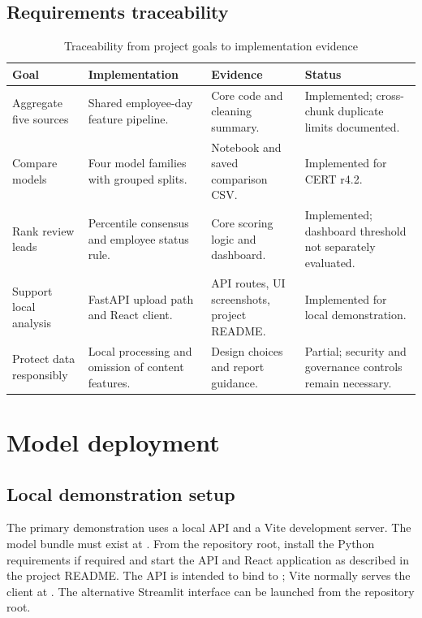 \section{Requirements traceability}
\begin{table}[H]
\centering
\tablefont
\caption{Traceability from project goals to implementation evidence}
\label{tab:traceability}
\begin{tabularx}{\textwidth}{|p{}|p{}|p{}|Y|}
\hline
\textbf{Goal} & \textbf{Implementation} & \textbf{Evidence} & \textbf{Status}\\\hline
Aggregate five sources & Shared employee-day feature pipeline. & Core code and cleaning summary. & Implemented; cross-chunk duplicate limits documented.\\\hline
Compare models & Four model families with grouped splits. & Notebook and saved comparison CSV. & Implemented for CERT r4.2.\\\hline
Rank review leads & Percentile consensus and employee status rule. & Core scoring logic and dashboard. & Implemented; dashboard threshold not separately evaluated.\\\hline
Support local analysis & FastAPI upload path and React client. & API routes, UI screenshots, project README. & Implemented for local demonstration.\\\hline
Protect data responsibly & Local processing and omission of content features. & Design choices and report guidance. & Partial; security and governance controls remain necessary.\\\hline
\end{tabularx}
\end{table}

\chapter{Model deployment}
\label{chap:deployment}

\section{Local demonstration setup}
The primary demonstration uses a local API and a Vite development
server. The model bundle must exist at
. From the
repository root, install the Python requirements if required and start
the API and React application as described in the project README.
The API is intended to bind to ; Vite normally serves
the client at . The alternative Streamlit
interface can be launched from the repository root.

